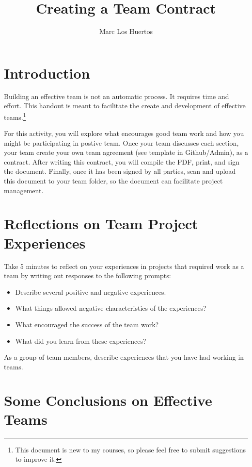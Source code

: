 \documentclass{article}\usepackage[]{graphicx}\usepackage[]{color}
\title{Creating a Team Contract}
\author{Marc Los Huertos}
\begin{document}
\maketitle

\section{Introduction}

Building an effective team is not an automatic process. It requires time and effort. This handout is meant to facilitate the create and development of effective teams.\footnote{This document is new to my courses, so please feel free to submit suggestions to improve it.}

For this activity, you will explore what encourages good team work and how you might be participating in postive team. Once your team discusses each section, your team create your own team agreement (see template in Github/Admin), as a contract. After writing this contract, you will compile the PDF, print, and sign the document. Finally, once it has been signed by all parties, scan and upload this document to your team folder, so the document can facilitate project management.

\section{Reflections on Team Project Experiences}

Take 5 minutes to reflect on your experiences in projects that required work as a team by writing out responses to the following prompts:

\begin{itemize}
  \item Describe several positive and negative experiences.
  \item What things allowed negative characteristics of the experiences?
  \item What encouraged the success of the team work?
  \item What did you learn from these experiences?
\end{itemize}

As a group of team members, describe experiences that you have had working in teams. 

\section{Some Conclusions on Effective Teams}
\end{document}

